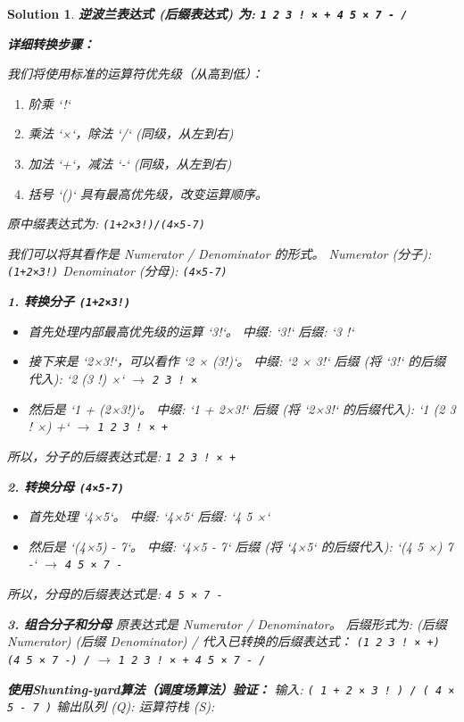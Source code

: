 \documentclass[UTF8]{report}
\newtheorem{solution}{Solution}
\theoremstyle{MyLineTheoremStyle} %
\theoremstyle{MyBlockTheoremStyle} %
\theoremstyle{MySubsubsectionStyle} %
\begin{document}
\begin{solution}
\textbf{逆波兰表达式 (后缀表达式) 为: \texttt{1 2 3 ! × + 4 5 × 7 - /}}

\textbf{详细转换步骤：}

我们将使用标准的运算符优先级（从高到低）：
\begin{enumerate}
    \item 阶乘 `!`
    \item 乘法 `×`，除法 `/` (同级，从左到右)
    \item 加法 `+`，减法 `-` (同级，从左到右)
    \item 括号 `()` 具有最高优先级，改变运算顺序。
\end{enumerate}

原中缀表达式为: \texttt{(1+2×3!)/(4×5-7)}

我们可以将其看作是 Numerator / Denominator 的形式。
Numerator (分子): \texttt{(1+2×3!)}
Denominator (分母): \texttt{(4×5-7)}

\textbf{1. 转换分子 \texttt{(1+2×3!)}}
\begin{itemize}
    \item 首先处理内部最高优先级的运算 `3!`。
        中缀: `3!`
        后缀: `3 !`
    \item 接下来是 `2×3!`，可以看作 `2 × (3!)`。
        中缀: `2 × 3!`
        后缀 (将 `3!` 的后缀代入): `2 (3 !) ×`  $\rightarrow$ \texttt{2 3 ! ×}
    \item 然后是 `1 + (2×3!)`。
        中缀: `1 + 2×3!`
        后缀 (将 `2×3!` 的后缀代入): `1 (2 3 ! ×) +` $\rightarrow$ \texttt{1 2 3 ! × +}
\end{itemize}
所以，分子的后缀表达式是: \texttt{1 2 3 ! × +}

\textbf{2. 转换分母 \texttt{(4×5-7)}}
\begin{itemize}
    \item 首先处理 `4×5`。
        中缀: `4×5`
        后缀: `4 5 ×`
    \item 然后是 `(4×5) - 7`。
        中缀: `4×5 - 7`
        后缀 (将 `4×5` 的后缀代入): `(4 5 ×) 7 -` $\rightarrow$ \texttt{4 5 × 7 -}
\end{itemize}
所以，分母的后缀表达式是: \texttt{4 5 × 7 -}

\textbf{3. 组合分子和分母}
原表达式是 Numerator / Denominator。
后缀形式为: (后缀 Numerator) (后缀 Denominator) /
代入已转换的后缀表达式：
\texttt{(1 2 3 ! × +) (4 5 × 7 -) /}
$\rightarrow$ \texttt{1 2 3 ! × + 4 5 × 7 - /}

\textbf{使用Shunting-yard算法（调度场算法）验证：}
输入: \texttt{( 1 + 2 × 3 ! ) / ( 4 × 5 - 7 )}
输出队列 (Q):
运算符栈 (S):


\end{solution}
\end{document}
